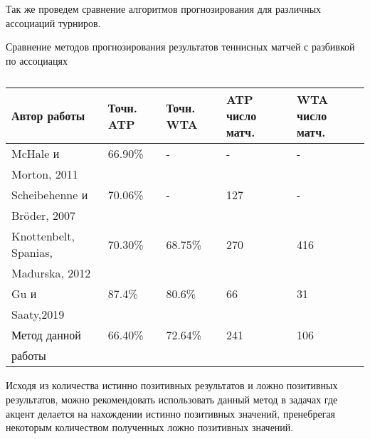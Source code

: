 Так же проведем сравнение алгоритмов прогнозирования для различных  ассоциаций турниров.
\begin{table}[!h]
	
	\caption{\label{tab:issled2}}{Сравнение методов прогнозирования результатов теннисных матчей с разбивкой по ассоциацях}
	
	\begin{center}
		
		\begin{tabular}{|l|l|l|l|l|}
		\hline
		
		Автор работы& Точн. ATP & Точн. WTA&ATP число матч. & WTA число матч. \\
		
		\hline 
		
		McHale и &66.90\%& - & - & -  \\
		Morton, 2011  \cite{Book18} & & & &  \\
		\hline
		Scheibehenne и  & 70.06\% & - & 127 & -  \\
		Bröder,
		2007\cite{Book40} &&&& \\
		\hline
		Knottenbelt, Spanias,& 70.30\% & 68.75\% & 270& 416	\\		Madurska, 2012\cite{Book41} & & && \\
		\hline
		Gu и  &87.4\%& 80.6\%&66&31\\
		 Saaty,2019\cite{Book42}&&&&\\
		\hline
		Метод данной &66.40\%& 72.64\%&241&106\\
		работы &&&&\\
		\hline
			
		\end{tabular}
		
	\end{center}
	
\end{table}

Исходя из количества истинно позитивных результатов и ложно позитивных результатов, можно рекомендовать использовать данный метод в задачах где акцент делается на нахождении истинно позитивных значений, пренебрегая некоторым количеством полученных ложно позитивных значений.
